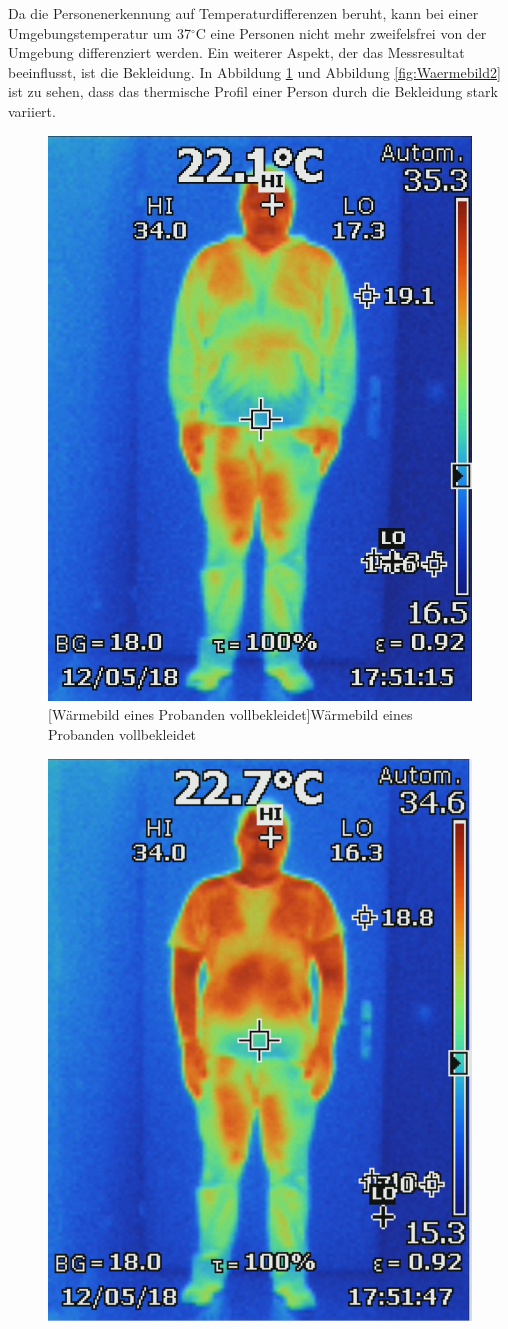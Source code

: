 Da die Personenerkennung auf Temperaturdifferenzen beruht, kann bei einer Umgebungstemperatur um 37$^\circ$C eine Personen nicht mehr zweifelsfrei von der Umgebung differenziert werden.
\newpage
Ein weiterer Aspekt, der das Messresultat beeinflusst, ist die Bekleidung. In Abbildung \ref{fig:Waermebild} und Abbildung \ref{fig:Waermebild2} ist zu sehen, dass das thermische Profil einer Person durch die Bekleidung stark variiert.
\begin{figure}[!ht]
	\centering
	\begin{minipage}[b]{0.4\linewidth}
		\centering	
		\includegraphics[width=0.70\linewidth]{fig/waermebild1.jpg}
		[Wärmebild eines Probanden vollbekleidet]{Wärmebild eines Probanden vollbekleidet}
		\label{fig:Waermebild}
	\end{minipage}
	\hfill
	\begin{minipage}[b]{0.4\linewidth}
		\centering
		\includegraphics[width=0.70\linewidth]{fig/waermebild2.png}

\end{minipage}
\end{figure}
